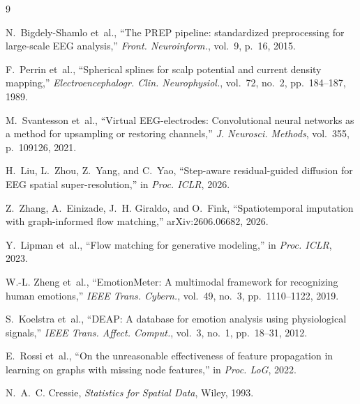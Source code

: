 \documentclass{article}
\begin{document}
\begin{thebibliography}{9}

N.~Bigdely-Shamlo et~al.,
``The PREP pipeline: standardized preprocessing for large-scale EEG
analysis,'' \emph{Front. Neuroinform.}, vol.~9, p.~16, 2015.

F.~Perrin et~al.,
``Spherical splines for scalp potential and current density mapping,''
\emph{Electroencephalogr. Clin. Neurophysiol.}, vol.~72, no.~2,
pp.~184--187, 1989.

M.~Svantesson et~al.,
``Virtual EEG-electrodes: Convolutional neural networks as a method for
upsampling or restoring channels,'' \emph{J. Neurosci. Methods},
vol.~355, p.~109126, 2021.

H.~Liu, L.~Zhou, Z.~Yang, and C.~Yao,
``Step-aware residual-guided diffusion for EEG spatial super-resolution,''
in \emph{Proc. ICLR}, 2026.

Z.~Zhang, A.~Einizade, J.~H. Giraldo, and O.~Fink,
``Spatiotemporal imputation with graph-informed flow matching,''
arXiv:2606.06682, 2026.

Y.~Lipman et~al.,
``Flow matching for generative modeling,''
in \emph{Proc. ICLR}, 2023.

W.-L. Zheng et~al.,
``EmotionMeter: A multimodal framework for recognizing human emotions,''
\emph{IEEE Trans. Cybern.}, vol.~49, no.~3, pp.~1110--1122, 2019.

S.~Koelstra et~al.,
``DEAP: A database for emotion analysis using physiological signals,''
\emph{IEEE Trans. Affect. Comput.}, vol.~3, no.~1, pp.~18--31, 2012.

E.~Rossi et~al.,
``On the unreasonable effectiveness of feature propagation in learning on
graphs with missing node features,''
in \emph{Proc. LoG}, 2022.

N.~A.~C. Cressie, \emph{Statistics for Spatial Data}, Wiley, 1993.

\end{thebibliography}
\end{document}
